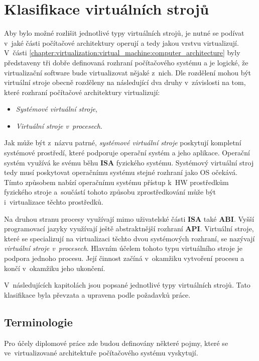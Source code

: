 \section{Klasifikace virtuálních strojů}
\label{chapter:virtualization:clasification}
Aby bylo možné rozlišit jednotlivé typy virtuálních strojů, je nutné se podívat v~jaké části počítačové architektury operují
a tedy jakou vrstvu virtualizují. V~části \ref{chapter:virtualization:virtual_machine:computer_architecture} byly představeny 
tři dobře definovaná rozhraní počítačového systému a je logické, že virtualizační software bude virtualizovat nějaké z~nich.
Dle rozdělení \cite{book:iee:vm_architecture} mohou být virtuální stroje obecně rozděleny na následující dva druhy v~závislosti
na tom, které rozhraní počítačové architektury virtualizují:
\begin{itemize}
  \item \textit{Systémové virtuální stroje},
  \item \textit{Virtuální stroje v~procesech}.
\end{itemize}
Jak může být z~názvu patrné, \textit{systémové virtuální stroje} poskytují kompletní systémové prostředí, které podporuje
operační systém a jeho aplikace. Operační systém využívá ke svému běhu \textbf{ISA} fyzického systému. Systémový virtuální
stroj tedy musí poskytovat operačnímu systému stejné rozhraní jako OS očekává. Tímto způsobem nabízí operačnímu systému
přístup k~HW prostředkům fyzického stroje a~součástí tohoto způsobu zprostředkování může být i~virtualizace těchto prostředků.

Na druhou stranu procesy využívají mimo uživatelské části \textbf{ISA} také \textbf{ABI}. Vyšší programovací jazyky využívají
ještě abstraktnější rozhraní \textbf{API}. Virtuální stroje, které se specializují na virtualizaci těchto dvou systémových 
rozhraní, se nazývají \textit{virtuální stroje v~procesech}. Hlavním účelem tohoto typu virtuálního stroje je podpora jednoho
procesu. Její činnost začíná v~okamžiku vytvoření procesu a končí v~okamžiku jeho ukončení.

V~následujících kapitolách jsou popsané jednotlivé typy virtuálních strojů. Tato klasifikace \cite{book:iee:vm_architecture}
byla převzata a upravena podle požadavků práce.
\subsection{Terminologie}
\label{chapter:virtualization:clasification:terms}
Pro účely diplomové práce zde budou definovány některé pojmy, které se ve~virtualizované architektuře počítačového systému vyskytují. 

